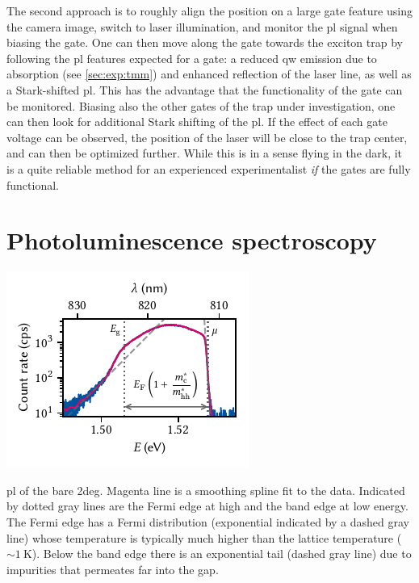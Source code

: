 The second approach is to roughly align the position on a large gate feature using the camera image, switch to laser illumination, and monitor the \gls{pl} signal when biasing the gate.
One can then move along the gate towards the exciton trap by following the \gls{pl} features expected for a gate: a reduced \gls{qw} emission due to absorption (see \cref{sec:exp:tmm}) and enhanced reflection of the laser line, as well as a Stark-shifted \gls{pl}.
This has the advantage that the functionality of the gate can be monitored.
Biasing also the other gates of the trap under investigation, one can then look for additional Stark shifting of the \gls{pl}.
If the effect of each gate voltage can be observed, the position of the laser will be close to the trap center, and can then be optimized further.
While this is in a sense flying in the dark, it is a quite reliable method for an experienced experimentalist \emph{if} the gates are fully functional.

\section{Photoluminescence spectroscopy}\label{sec:exp:observations:pl}

\begin{marginfigure}
    \centering
    \includegraphics{img/pdf/experiment/2deg_pl}
    \caption[
        \protect\newline
    ]{
        \Gls{pl} of the bare \gls{2deg}.
        Magenta line is a smoothing spline fit to the data.
        Indicated by dotted gray lines are the Fermi edge at high and the band edge at low energy.
        The Fermi edge has a Fermi distribution (exponential indicated by a dashed gray line) whose temperature is typically much higher than the lattice temperature ($\sim\qty{1}{\kelvin}$).
        Below the band edge there is an exponential tail (dashed gray line) due to impurities that permeates far into the gap.
    }
    \label{fig:exp:pl:2deg}
\end{marginfigure}

